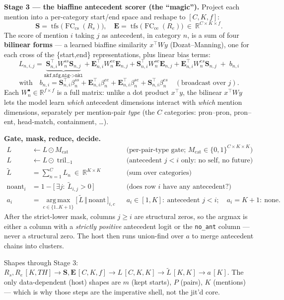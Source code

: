 \documentclass[11pt]{article}
\newcommand{\R}{\mathbb{R}}
\newcommand{\FC}[1]{\operatorname{FC}_{#1}}
\begin{document}
\textbf{Stage 3 — the biaffine antecedent scorer (the ``magic'').}
Project each mention into a per-category start/end space and reshape to $[C,K,f]$:
\[
\mathbf{S} = \operatorname{tfs}\!\big(\FC{\text{cs}}(R_s)\big),\quad
\mathbf{E} = \operatorname{tfs}\!\big(\FC{\text{ce}}(R_e)\big)\ \in\ \R^{C\times K\times f}.
\]
The score of mention $i$ taking $j$ as antecedent, in category $n$, is a sum of four
\textbf{bilinear forms} — a learned biaffine similarity $x^\top W y$ (Dozat--Manning), one for each
cross of the \{start,end\} representations, plus linear bias terms:
\[
\boxed{\;
L_{n,i,j} =
\underbrace{\mathbf{S}_{n,i}^\top W^{ss}_n \mathbf{S}_{n,j}}_{\texttt{nkf,nfg,nlg->nkl}}
+ \mathbf{E}_{n,i}^\top W^{ee}_n \mathbf{E}_{n,j}
+ \mathbf{S}_{n,i}^\top W^{se}_n \mathbf{E}_{n,j}
+ \mathbf{E}_{n,i}^\top W^{es}_n \mathbf{S}_{n,j}
\;+\; b_{n,i}\;}
\]
\[
\text{with}\quad
b_{n,i} = \mathbf{S}_{n,i}^\top \beta^{ss}_n + \mathbf{E}_{n,i}^\top \beta^{ee}_n
        + \mathbf{E}_{n,i}^\top \beta^{se}_n + \mathbf{S}_{n,i}^\top \beta^{es}_n
\quad(\text{broadcast over } j).
\]
Each $W^{\bullet}_n\in\R^{f\times f}$ is a full matrix: unlike a dot product $x^\top y$, the bilinear
$x^\top W y$ lets the model learn \emph{which} antecedent dimensions interact with \emph{which}
mention dimensions, separately per mention-pair \emph{type} (the $C$ categories: pron--pron,
pron--ent, head-match, containment, \ldots).

\textbf{Gate, mask, reduce, decide.}
\begin{align*}
L &\leftarrow L \odot M_{\text{cat}} && \text{(per-pair-type gate; }M_{\text{cat}}\in\{0,1\}^{C\times K\times K}\text{)}\\
L &\leftarrow L \odot \operatorname{tril}_{-1} && \text{(antecedent } j<i \text{ only: no self, no future)}\\
\tilde L &= \textstyle\sum_{n=1}^{C} L_n \ \in\ \R^{K\times K} && \text{(sum over categories)}\\
\text{noant}_i &= 1 - \big[\,\exists j:\ \tilde L_{i,j}>0\,\big] && \text{(does row }i\text{ have any antecedent?)}\\
a_i &= \operatorname*{arg\,max}_{c\in\{1..K{+}1\}} \big[\,\tilde L \,\Vert\, \text{noant}\,\big]_{i,c}
   && a_i\in[1,K]\!:\ \text{antecedent } j{<}i;\quad a_i{=}K{+}1\!:\ \text{none}.
\end{align*}
After the strict-lower mask, columns $j\ge i$ are structural zeros, so the argmax is either a
column with a \emph{strictly positive} antecedent logit or the \texttt{no\_ant} column — never a
structural zero. The host then runs union-find over $a$ to merge antecedent chains into clusters.

\hrulefill

{\small Shapes through Stage 3: $R_{s},R_e\,[K,\mathit{TH}] \to \mathbf{S},\mathbf{E}\,[C,K,f]
\to L\,[C,K,K] \to \tilde L\,[K,K] \to a\,[K]$. The only data-dependent (host) shapes are
$m$ (kept starts), $P$ (pairs), $K$ (mentions) — which is why those steps are the imperative shell,
not the jit'd core.}
\end{document}
